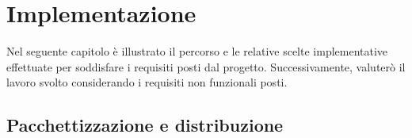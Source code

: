 

\chapter{Implementazione}

Nel seguente capitolo è illustrato il percorso e le relative scelte implementative effettuate per soddisfare i requisiti posti dal progetto. Successivamente, valuterò il lavoro svolto considerando i requisiti non funzionali posti.

\section{Pacchettizzazione e distribuzione}

